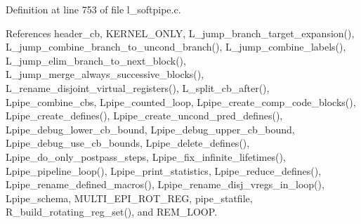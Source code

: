 Definition at line 753 of file l\_\-softpipe.c.

References header\_\-cb, KERNEL\_\-ONLY, L\_\-jump\_\-branch\_\-target\_\-expansion(), L\_\-jump\_\-combine\_\-branch\_\-to\_\-uncond\_\-branch(), L\_\-jump\_\-combine\_\-labels(), L\_\-jump\_\-elim\_\-branch\_\-to\_\-next\_\-block(), L\_\-jump\_\-merge\_\-always\_\-successive\_\-blocks(), L\_\-rename\_\-disjoint\_\-virtual\_\-registers(), L\_\-split\_\-cb\_\-after(), Lpipe\_\-combine\_\-cbs, Lpipe\_\-counted\_\-loop, Lpipe\_\-create\_\-comp\_\-code\_\-blocks(), Lpipe\_\-create\_\-defines(), Lpipe\_\-create\_\-uncond\_\-pred\_\-defines(), Lpipe\_\-debug\_\-lower\_\-cb\_\-bound, Lpipe\_\-debug\_\-upper\_\-cb\_\-bound, Lpipe\_\-debug\_\-use\_\-cb\_\-bounds, Lpipe\_\-delete\_\-defines(), Lpipe\_\-do\_\-only\_\-postpass\_\-steps, Lpipe\_\-fix\_\-infinite\_\-lifetimes(), Lpipe\_\-pipeline\_\-loop(), Lpipe\_\-print\_\-statistics, Lpipe\_\-reduce\_\-defines(), Lpipe\_\-rename\_\-defined\_\-macros(), Lpipe\_\-rename\_\-disj\_\-vregs\_\-in\_\-loop(), Lpipe\_\-schema, MULTI\_\-EPI\_\-ROT\_\-REG, pipe\_\-statfile, R\_\-build\_\-rotating\_\-reg\_\-set(), and REM\_\-LOOP.